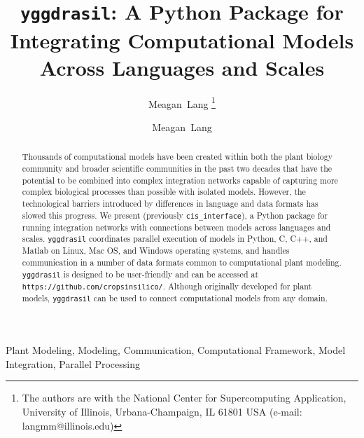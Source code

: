 \documentclass[journal]{IEEEtran}
\newcommand{\todo}[1]{{\color{red}{#1}}}
\newcommand{\pkg}{{\tt yggdrasil}{}}
\newcommand{\cis}{{\tt cis\_interface}{}}
\newcommand{\pkglink}{\todo{cis\_interface}}
\newcommand{\hrefgit}[1]{\href{https://github.com/cropsinsilico/cis_interface}{\todo{#1}}}
\begin{document}
\ifieee
\else
	\shorttitle{{\pkg}}
\fi

\title{{\pkg}: A Python Package for Integrating Computational Models Across Languages and Scales}

\ifieee
	\author{Meagan~Lang%
	\thanks{The authors are with the National Center for Supercomputing Application, University of Illinois, Urbana-Champaign, IL 61801 USA (e-mail: langmm@illinois.edu)}}
\else
	\author{Meagan~Lang}

\fi


\ifieee
	\maketitle
\fi

\begin{abstract}
Thousands of computational models have been created within both the plant biology community and broader scientific communities in the past two decades that have the potential to be combined into complex integration networks capable of capturing more complex biological processes than possible with isolated models. However, the technological barriers introduced by differences in language and data formats has slowed this progress. We present \hrefgit{\pkg} (previously {\cis}), a Python package for running integration networks with connections between models across languages and scales. {\pkg} coordinates parallel execution of models in Python, C, C++, and Matlab on Linux, Mac OS, and Windows operating systems, and handles communication in a number of data formats common to computational plant modeling. {\pkg} is designed to be user-friendly and can be accessed at {\tt https://github.com/cropsinsilico/\pkglink}. Although originally developed for plant models, {\pkg} can be used to connect computational models from any domain.
\end{abstract}

\ifieee
	\begin{IEEEkeywords}
		Plant Modeling, Modeling, Communication, Computational Framework, Model Integration, Parallel Processing
	\end{IEEEkeywords}
	\IEEEpeerreviewmaketitle
\else
	\maketitle
\fi
\end{document}
